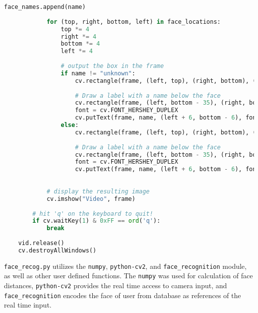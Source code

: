 \documentclass[12pt]{article}
\begin{document}
\begin{lstlisting}[language=Python, caption={\texttt{code\_email.py}}]
				face_names.append(name)
			
			for (top, right, bottom, left) in face_locations:
				top *= 4
				right *= 4
				bottom *= 4
				left *= 4
				
				# output the box in the frame
				if name != "unknown":
					cv.rectangle(frame, (left, top), (right, bottom), (0, 255, 0), 2)
				
					# Draw a label with a name below the face
					cv.rectangle(frame, (left, bottom - 35), (right, bottom), (0, 255, 0), cv.FILLED)
					font = cv.FONT_HERSHEY_DUPLEX
					cv.putText(frame, name, (left + 6, bottom - 6), font, 1.0, (255, 255, 255), 1)
				else:
					cv.rectangle(frame, (left, top), (right, bottom), (0, 0, 255), 2)
				
					# Draw a label with a name below the face
					cv.rectangle(frame, (left, bottom - 35), (right, bottom), (0, 0, 255), cv.FILLED)
					font = cv.FONT_HERSHEY_DUPLEX
					cv.putText(frame, name, (left + 6, bottom - 6), font, 1.0, (255, 255, 255), 1)
					
			
			# display the resulting image
			cv.imshow("Video", frame)
		
		# hit 'q' on the keyboard to quit!
		if cv.waitKey(1) & 0xFF == ord('q'):
			break
		
	vid.release()
	cv.destroyAllWindows()
\end{lstlisting}
\doublespacing

\texttt{face\_recog.py} utilizes the \texttt{numpy}, \texttt{python-cv2}, and \texttt{face\_recognition} module, as well as other user defined functions. The \texttt{numpy} was used for calculation of face distances, \texttt{python-cv2} provides the real time access to camera input, and \texttt{face\_recognition} encodes the face of user from database as references of the real time input.
\end{document}
